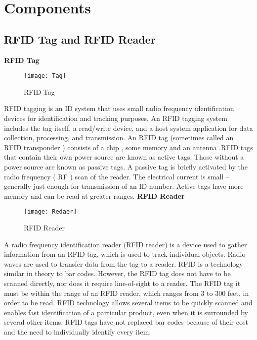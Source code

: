 \documentclass[12pt,a4paper]{report}
\begin{document}
\section{Components}
\subsection{RFID Tag and RFID Reader}
\textbf{RFID Tag}\\

	\begin{figure}[H]
		\begin{center}
		\texttt{[image: Tag]}
		\caption{RFID Tag}
	\end{center}
	\end{figure}

RFID tagging is an ID system that uses small radio frequency identification devices for identification and tracking purposes. An RFID tagging system includes the tag itself, a read/write device, and a host system application for data collection, processing, and transmission. An RFID tag (sometimes called an RFID transponder ) consists of a chip , some memory and an antenna .RFID tags that contain their own power source are known as active tags. Those without a power source are known as passive tags. A passive tag is briefly activated by the radio frequency ( RF ) scan of the reader. The electrical current is small -- generally just enough for transmission of an ID number. Active tags have more memory and can be read at greater ranges.
\newpage
\textbf{RFID Reader}\\

\begin{figure}[H]
	\begin{center}
		\texttt{[image: Redaer]}
		\caption{RFID Reader}
	\end{center}
\end{figure}

A radio frequency identification reader (RFID reader) is a device used to gather information from an RFID tag, which is used to track individual objects. Radio waves are used to transfer data from the tag to a reader. RFID is a technology similar in theory to bar codes. However, the RFID tag does not have to be scanned directly, nor does it require line-of-sight to a reader. The RFID tag it must be within the range of an RFID reader, which ranges from 3 to 300 feet, in order to be read. RFID technology allows several items to be quickly scanned and enables fast identification of a particular product, even when it is surrounded by several other items.
RFID tags have not replaced bar codes because of their cost and the need to individually identify every item.\\
\end{document}

